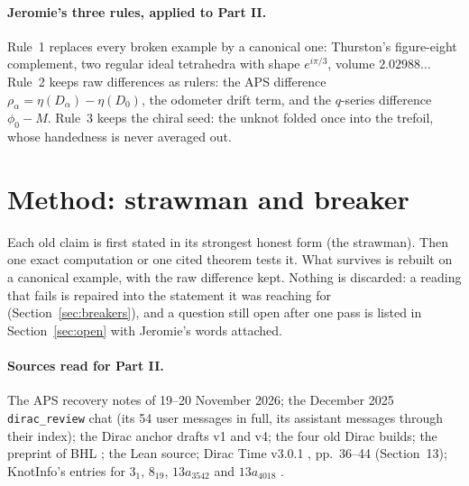 \documentclass[11pt]{article}
\theoremstyle{definition}
\begin{document}
\paragraph{Jeromie's three rules, applied to Part II.} Rule~1 replaces every broken example by a canonical one: Thurston's figure-eight complement, two regular ideal tetrahedra with shape $e^{i\pi/3}$, volume $2.02988\ldots$ Rule~2 keeps raw differences as rulers: the APS difference $\rho_\alpha=\eta(D_\alpha)-\eta(D_0)$, the odometer drift term, and the $q$-series difference $\phi_0-M$. Rule~3 keeps the chiral seed: the unknot folded once into the trefoil, whose handedness is never averaged out.

\section{Method: strawman and breaker}
Each old claim is first stated in its strongest honest form (the strawman). Then one exact computation or one cited theorem tests it. What survives is rebuilt on a canonical example, with the raw difference kept. Nothing is discarded: a reading that fails is repaired into the statement it was reaching for (Section~\ref{sec:breakers}), and a question still open after one pass is listed in Section~\ref{sec:open} with Jeromie's words attached.

\paragraph{Sources read for Part II.} The APS recovery notes of 19--20 November 2026; the December 2025 \texttt{dirac\_review} chat (its 54 user messages in full, its assistant messages through their index); the Dirac anchor drafts v1 and v4; the four old Dirac builds; the preprint of BHL \cite{BHL}; the Lean source; Dirac Time v3.0.1 \cite{DiracTime}, pp.~36--44 (Section~13); KnotInfo's entries for $3_1$, $8_{19}$, $13a_{3542}$ and $13a_{4018}$ \cite{KnotInfo}.
\end{document}
